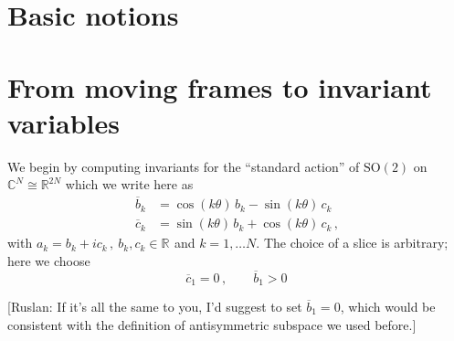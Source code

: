 \documentclass[aip,cha,showpacs,twocolumn,
 		  reprint]{revtex4-1} %
\newcommand{\beq}{\begin{equation}}
\newcommand{\eeq}{\end{equation}}
\newcommand{\bseq}{\begin{subequations}}
\newcommand{\eseq}{\end{subequations}}
\newcommand{\barr}{\begin{array}}
\newcommand{\earr}{\end{array}}
\newcommand{\Rls}[1]{\ensuremath{\mathbb{R}^{#1}}}
\newcommand{\Clx}[1]{\ensuremath{\mathbb{C}^{#1}}}
\newcommand{\SOn}[1]{\ensuremath{\textrm{SO}(#1)}}         %
\begin{document}
\section{Basic notions\label{s:notions}}

\section{From moving frames to invariant variables}

We begin by computing invariants for the ``standard action''
of $\SOn{2}$ on $\Clx{N}\cong\Rls{2N}$
which we write here as
\bseq\label{eq:SO2stand}
  \begin{align}
	  \overline{b}_k &= \cos(k\theta)\,b_k - \sin(k\theta)\,c_k\,\label{eq:SO2stand1}\\
	  \overline{c}_k &= \sin(k\theta)\,b_k + \cos(k\theta)\,c_k\,,\label{eq:SO2stand2}
  \end{align}
\eseq
with $a_k=b_k+i c_k\,,\ b_k,c_k\in\Rls{}$ and $k=1,\ldots N$.
The choice of a slice is arbitrary; here we choose
\beq
 	\overline{c}_1=0\,,\qquad \overline{b}_1>0\,
\eeq

[Ruslan: If it's all the same to you, I'd suggest to set $\overline{b}_1=0$, which would be consistent with the definition of antisymmetric subspace we used before.]
\end{document}

